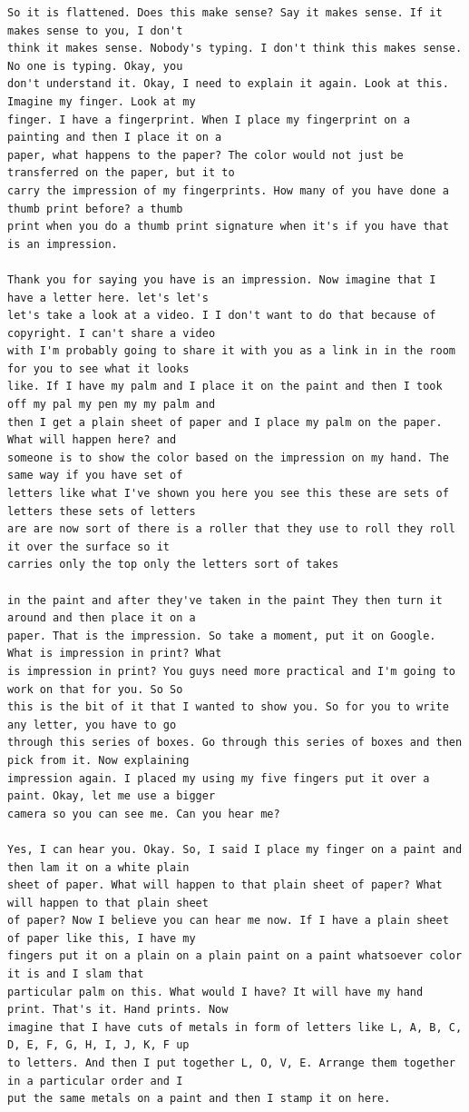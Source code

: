 {\begin{Verbatim}
So it is flattened. Does this make sense? Say it makes sense. If it makes sense to you, I don't
think it makes sense. Nobody's typing. I don't think this makes sense. No one is typing. Okay, you
don't understand it. Okay, I need to explain it again. Look at this. Imagine my finger. Look at my
finger. I have a fingerprint. When I place my fingerprint on a painting and then I place it on a
paper, what happens to the paper? The color would not just be transferred on the paper, but it to
carry the impression of my fingerprints. How many of you have done a thumb print before? a thumb
print when you do a thumb print signature when it's if you have that is an impression.

Thank you for saying you have is an impression. Now imagine that I have a letter here. let's let's
let's take a look at a video. I I don't want to do that because of copyright. I can't share a video
with I'm probably going to share it with you as a link in in the room for you to see what it looks
like. If I have my palm and I place it on the paint and then I took off my pal my pen my my palm and
then I get a plain sheet of paper and I place my palm on the paper. What will happen here? and
someone is to show the color based on the impression on my hand. The same way if you have set of
letters like what I've shown you here you see this these are sets of letters these sets of letters
are are now sort of there is a roller that they use to roll they roll it over the surface so it
carries only the top only the letters sort of takes

in the paint and after they've taken in the paint They then turn it around and then place it on a
paper. That is the impression. So take a moment, put it on Google. What is impression in print? What
is impression in print? You guys need more practical and I'm going to work on that for you. So So
this is the bit of it that I wanted to show you. So for you to write any letter, you have to go
through this series of boxes. Go through this series of boxes and then pick from it. Now explaining
impression again. I placed my using my five fingers put it over a paint. Okay, let me use a bigger
camera so you can see me. Can you hear me?

Yes, I can hear you. Okay. So, I said I place my finger on a paint and then lam it on a white plain
sheet of paper. What will happen to that plain sheet of paper? What will happen to that plain sheet
of paper? Now I believe you can hear me now. If I have a plain sheet of paper like this, I have my
fingers put it on a plain on a plain paint on a paint whatsoever color it is and I slam that
particular palm on this. What would I have? It will have my hand print. That's it. Hand prints. Now
imagine that I have cuts of metals in form of letters like L, A, B, C, D, E, F, G, H, I, J, K, F up
to letters. And then I put together L, O, V, E. Arrange them together in a particular order and I
put the same metals on a paint and then I stamp it on here.


\end{Verbatim}}
